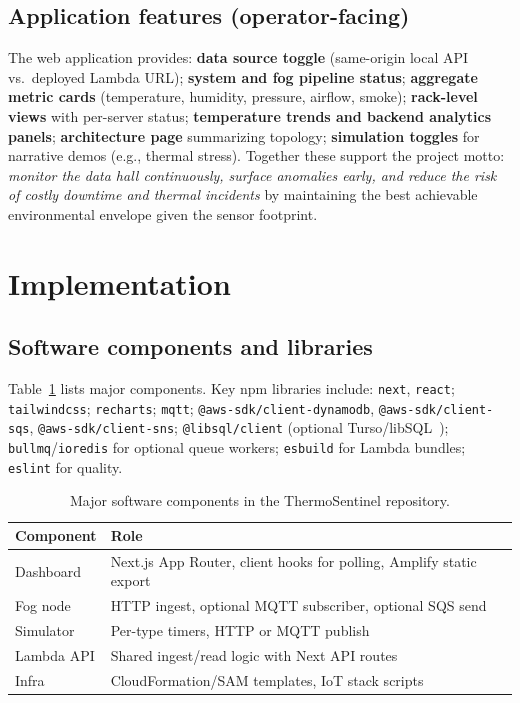 \documentclass[conference]{IEEEtran}
\begin{document}
\subsection{Application features (operator-facing)}
The web application provides: \textbf{data source toggle} (same-origin local API vs.\ deployed Lambda URL); \textbf{system and fog pipeline status}; \textbf{aggregate metric cards} (temperature, humidity, pressure, airflow, smoke); \textbf{rack-level views} with per-server status; \textbf{temperature trends and backend analytics panels}; \textbf{architecture page} summarizing topology; \textbf{simulation toggles} for narrative demos (e.g., thermal stress). Together these support the project motto: \emph{monitor the data hall continuously, surface anomalies early, and reduce the risk of costly downtime and thermal incidents} by maintaining the best achievable environmental envelope given the sensor footprint.

\section{Implementation}

\subsection{Software components and libraries}
Table~\ref{tab:components} lists major components. Key npm libraries include: \texttt{next}, \texttt{react}; \texttt{tailwindcss}; \texttt{recharts}; \texttt{mqtt}; \texttt{@aws-sdk/client-dynamodb}, \texttt{@aws-sdk/client-sqs}, \texttt{@aws-sdk/client-sns}; \texttt{@libsql/client} (optional Turso/libSQL~\cite{libsql2024}); \texttt{bullmq}/\texttt{ioredis} for optional queue workers; \texttt{esbuild} for Lambda bundles; \texttt{eslint} for quality.

\begin{table}[htbp]
\caption{Major software components in the ThermoSentinel repository.}
\label{tab:components}
\begin{center}
\begin{tabular}{@{}p{}p{}@{}}
\toprule
\textbf{Component} & \textbf{Role} \\
\midrule
Dashboard & Next.js App Router, client hooks for polling, Amplify static export \\
Fog node & HTTP ingest, optional MQTT subscriber, optional SQS send \\
Simulator & Per-type timers, HTTP or MQTT publish \\
Lambda API & Shared ingest/read logic with Next API routes \\
Infra & CloudFormation/SAM templates, IoT stack scripts \\
\bottomrule
\end{tabular}
\end{center}
\end{table}
\end{document}
